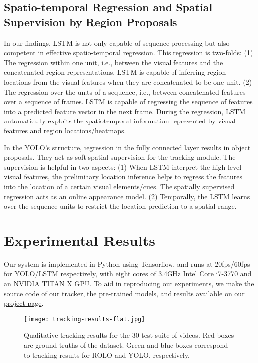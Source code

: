 \documentclass{article}
\begin{document}
\subsection{Spatio-temporal Regression and Spatial Supervision by Region Proposals}
In our findings, LSTM is not only capable of sequence processing but also competent in effective spatio-temporal regression. This regression is two-folds: 
(1) The regression within one unit, i.e., between the visual features and the concatenated region representations. LSTM is capable of inferring region locations from the visual features when they are concatenated to be one unit.
(2) The regression over the units of a sequence, i.e., between concatenated features over a sequence of frames. LSTM is capable of regressing the sequence of features into a predicted feature vector in the next frame. During the regression, LSTM automatically exploits the spatiotemporal information represented by visual features and region locations/heatmaps. 

In the YOLO’s structure, regression in the fully connected layer results in object proposals. They act as soft spatial supervision for the tracking module. The supervision is helpful in two aspects: 
(1) When LSTM interpret the high-level visual features, the preliminary location inference helps to regress the features into the location of a certain visual elements/cues. The spatially supervised regression acts as an online appearance model.
(2) Temporally, the LSTM learns over the sequence units to restrict the location prediction to a spatial range.  


\section{Experimental Results} \label{experimental-results}
Our system is implemented in Python using Tensorflow, and runs at 20fps/60fps for YOLO/LSTM respectively, with eight cores of 3.4GHz Intel Core i7-3770 and an NVIDIA TITAN X GPU.   
To aid in reproducing our experiments, we make the source code of our tracker, the pre-trained models, and results available on our \href{http://guanghan.info/projects/ROLO/}{project page}.

\begin{figure}[h] %
	\centering
	\texttt{[image: tracking-results-flat.jpg]}
	\caption{Qualitative tracking results for the 30 test suite of videos. Red boxes are ground truths of the dataset. Green and blue boxes correspond to tracking results for ROLO and YOLO, respectively.}
	\label{fig-qualitative-results}
\end{figure}
\end{document}
